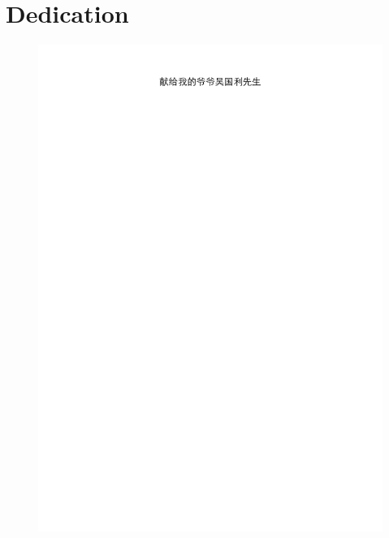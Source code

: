 
\chapter{Dedication}

\begin{figure}[!ht]
\centering
\includegraphics[width=\textwidth]{img/dedicate.pdf}
\end{figure}